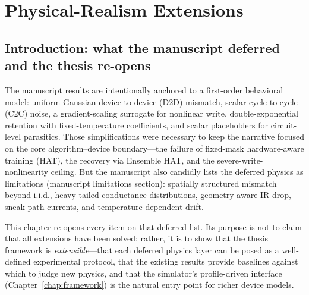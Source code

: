 
%

\chapter{Physical-Realism Extensions}
\label{chap:physical-realism}

\section{Introduction: what the manuscript deferred and the thesis re-opens}
\label{sec:pr-intro}

The manuscript results are intentionally anchored to a first-order behavioral model: uniform Gaussian device-to-device (D2D) mismatch, scalar cycle-to-cycle (C2C) noise, a gradient-scaling surrogate for nonlinear write, double-exponential retention with fixed-temperature coefficients, and scalar placeholders for circuit-level parasitics.  Those simplifications were necessary to keep the narrative focused on the core algorithm--device boundary---the failure of fixed-mask hardware-aware training (HAT), the recovery via Ensemble HAT, and the severe-write-nonlinearity ceiling.  But the manuscript also candidly lists the deferred physics as limitations (manuscript limitations section): spatially structured mismatch beyond i.i.d., heavy-tailed conductance distributions, geometry-aware IR drop, sneak-path currents, and temperature-dependent drift.

This chapter re-opens every item on that deferred list.  Its purpose is not to claim that all extensions have been solved; rather, it is to show that the thesis framework is
\emph{extensible}---that each deferred physics layer can be posed as a well-defined experimental protocol, that the existing results provide baselines against which to judge new physics, and that the simulator's profile-driven interface (Chapter~\ref{chap:framework}) is the natural entry point for richer device models.

